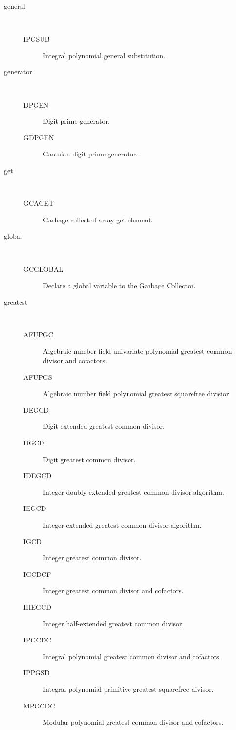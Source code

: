 \begin{description}
\item[general] \ \ 
  \begin{description}
  \item[IPGSUB]  Integral polynomial general substitution.
  \end{description}
\item[generator] \ \ 
  \begin{description}
  \item[DPGEN]  Digit prime generator.
  \item[GDPGEN]  Gaussian digit prime generator.
  \end{description}
\item[get] \ \ 
  \begin{description}
  \item[GCAGET]  Garbage collected array get element.
  \end{description}
\item[global] \ \ 
  \begin{description}
  \item[GCGLOBAL]  Declare a global variable to the Garbage Collector.
  \end{description}
\item[greatest] \ \ 
  \begin{description}
  \item[AFUPGC]  Algebraic number field univariate polynomial greatest common
    divisor and cofactors.
  \item[AFUPGS]  Algebraic number field polynomial greatest squarefree
    divisior.
  \item[DEGCD]  Digit extended greatest common divisor.
  \item[DGCD]  Digit greatest common divisor.
  \item[IDEGCD]  Integer doubly extended greatest common divisor algorithm.
  \item[IEGCD]  Integer extended greatest common divisor algorithm.
  \item[IGCD]  Integer greatest common divisor.
  \item[IGCDCF]  Integer greatest common divisor and cofactors.
  \item[IHEGCD]  Integer half-extended greatest common divisor.
  \item[IPGCDC]  Integral polynomial greatest common divisor and cofactors.
  \item[IPPGSD]  Integral polynomial primitive greatest squarefree divisor.
  \item[MPGCDC]  Modular polynomial greatest common divisor and cofactors.

\end{description}
\end{description}
